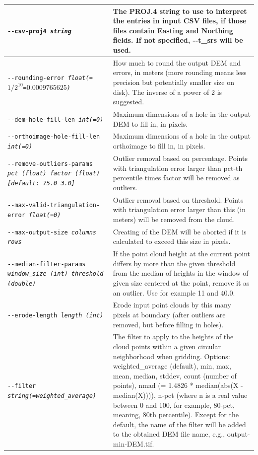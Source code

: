 \begin{longtable}{|p{8cm}|p{9cm}|}
\texttt{-\/-csv-proj4 \textit{string}} & The PROJ.4 string to use to
interpret the entries in input CSV files, if those files contain Easting
and Northing fields. If not specified, -\/-t\_srs will be used.  \\
\hline
\texttt{-\/-rounding-error \textit{float(=$1/2^{10}$=$0.0009765625$)}} & How much to round the output DEM and errors, in meters (more rounding means less precision but potentially smaller size on disk). The inverse of a power of 2 is suggested. \\ \hline
\texttt{-\/-dem-hole-fill-len \textit{int(=0)}} &  Maximum dimensions of a hole in the output DEM to fill in, in pixels. \\ \hline
\texttt{-\/-orthoimage-hole-fill-len \textit{int(=0)}} & Maximum dimensions of a hole in the output orthoimage to fill in, in pixels. \\ \hline
\texttt{-\/-remove-outliers-params  \textit{pct (float) factor (float) [default: 75.0 3.0]}} & Outlier removal based on percentage. Points with triangulation error larger than pct-th percentile times factor will be removed as outliers. \\ \hline
\texttt{-\/-max-valid-triangulation-error \textit{float(=0)}} & Outlier removal based on threshold. Points with triangulation error larger than this (in meters) will be removed from the cloud. \\ \hline
\texttt{-\/-max-output-size \textit{columns rows} } & Creating of the DEM will be aborted if it is calculated to exceed this size in pixels. \\ \hline
\texttt{-\/-median-filter-params \textit{window\_size (int) threshold (double)}} & If the point cloud height at the current point differs by more than the given threshold from the median of heights in the window of given size centered at the point, remove it as an outlier. Use for example 11 and 40.0.\\ \hline
\texttt{-\/-erode-length \textit{length (int)}} & Erode input point clouds by this many pixels at boundary (after outliers are removed, but before filling in holes). \\ \hline

\texttt{-\/-filter \textit{string(=weighted\_average)}} & The filter to apply to the heights of the cloud points within a given circular neighborhood when gridding. Options: weighted\_average (default), min, max, mean, median, stddev, count (number of points), nmad (= 1.4826 * median(abs(X - median(X)))), n-pct (where n is a real value between 0 and 100, for example, 80-pct, meaning, 80th percentile). Except for the default, the name of the filter will be added to the obtained DEM file name, e.g., output-min-DEM.tif.  \\
\hline


\end{longtable}
